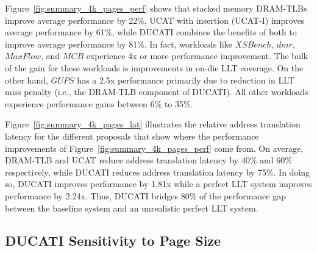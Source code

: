 Figure~\ref{fig:summary_4k_pages_perf} shows that stacked memory DRAM-TLBs
improve average performance by 22\%,
UCAT with insertion (UCAT-I) improves average performance by 61\%,
while DUCATI combines the benefits of both to improve average
performance by 81\%. In fact, workloads like $XSBench$, $dmr$,
$MaxFlow$, and $MCB$ experience 4x or more performance improvement.
The bulk of the gain for these workloads is improvements in on-die LLT
coverage. On the other hand, $GUPS$ has a 2.5x performance primarily
due to reduction in LLT miss penalty (i.e., the DRAM-TLB component of
DUCATI). All other workloads experience performance gains between 6\%
to 35\%.

Figure~\ref{fig:summary_4k_pages_lat} illustrates the relative address
translation latency for the different proposals that show where the performance improvements of Figure~\ref{fig:summary_4k_pages_perf} come from. On average, DRAM-TLB
and UCAT reduce address translation latency by 40\% and 60\%
respectively, while DUCATI reduces address translation latency by
75\%. In doing so, DUCATI improves performance by 1.81x while a
perfect LLT system improves performance by 2.24x. Thus, DUCATI bridges
80\% of the performance gap between the baseline system and an
unrealistic perfect LLT system.



\subsection{DUCATI Sensitivity to Page Size}

